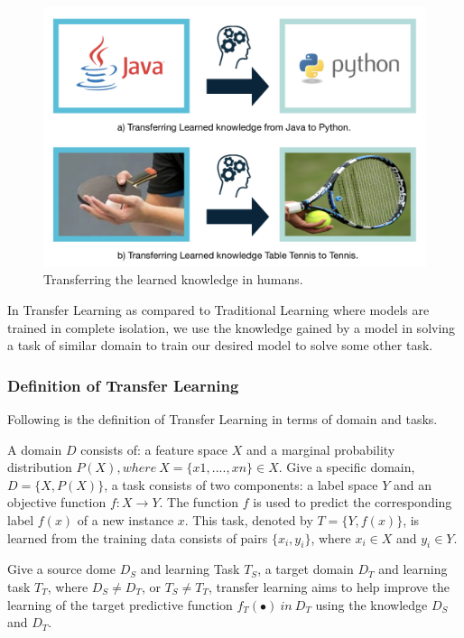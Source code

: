 \documentclass[a4paper, 12pt]{article}
\begin{document}
\begin{sloppypar}
\begin{figure}[H]
\begin{center}
\includegraphics[scale=0.25]{human_lt.png}
\caption{Transferring the learned knowledge in humans.\label{human}} %
\end{center}
\end{figure}

In Transfer Learning as compared to Traditional Learning  where models are trained in complete  isolation, we use the knowledge gained by a model in solving a task of similar domain to train our desired model to solve some other task.

\subsubsection{Definition of Transfer Learning}

Following is the definition of Transfer Learning in terms of domain and tasks.

A domain $D$ consists of: a feature space $X$ and a marginal probability distribution $P(X), where\ X = \{x1, ...., xn\} \in X$.  Give a specific domain, $D = \{X, P(X)\}$, a task consists of two components: a label space $Y$ and an objective function $f: X \rightarrow Y$. The function $f$ is used to predict the corresponding label $f(x)$ of a new instance $x$. This task, denoted by $T = \{Y, f(x)\}$, is learned from the training data consists of pairs $\{x_i, y_i\}$, where $x_i \in X$ and $y_i \in Y$. \cite{lin_improving_2017}

Give a source dome $D_S$ and learning Task $T_S$, a target domain $D_T$  and learning task $T_T$, where $D_S \ne D_T$, or $T_S \ne T_T$, transfer learning aims to help improve the learning of the target predictive function $f_T( \bullet ) \ in \ D_T$ using the knowledge $D_S$ and $D_T$. \cite{lin_improving_2017}


\end{sloppypar}
\end{document}
